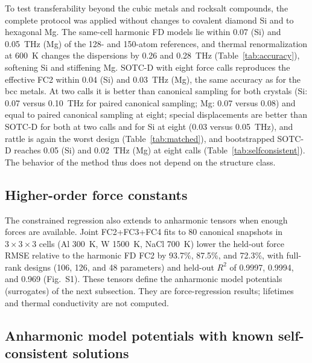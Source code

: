 \documentclass[aip,jap,reprint,amsmath,amssymb,floatfix]{revtex4-2}
\begin{document}
To test transferability beyond the cubic metals and rocksalt compounds,
the complete protocol was applied without changes to covalent diamond Si
and to hexagonal Mg. The same-cell harmonic FD models lie within 0.07 (Si)
and 0.05~THz (Mg) of the 128- and 150-atom references, and thermal
renormalization at 600~K changes the dispersions by 0.26 and 0.28~THz
(Table~\ref{tab:accuracy}), softening Si and stiffening Mg. SOTC-D with eight
force calls reproduces the effective FC2 within 0.04 (Si) and 0.03~THz (Mg),
the same accuracy as for the bcc metals. At two calls it is better than canonical
sampling for both crystals (Si: 0.07 versus 0.10~THz for
paired canonical sampling; Mg: 0.07 versus 0.08) and equal to paired
canonical sampling at eight; special displacements are better than SOTC-D
for both at two calls and for Si at eight (0.03 versus 0.05~THz), and
rattle is again the worst design (Table~\ref{tab:matched}),
and bootstrapped SOTC-D reaches 0.05 (Si) and 0.02~THz (Mg) at eight calls
(Table~\ref{tab:selfconsistent}). The behavior of the method thus does not
depend on the structure class.

\subsection{Higher-order force constants}\label{sec:ho}

The constrained regression also extends to anharmonic tensors when enough
forces are available. Joint FC2+FC3+FC4 fits to 80 canonical snapshots in
$3\times3\times3$ cells (Al 300~K, W 1500~K, NaCl 700~K) lower the held-out
force RMSE relative to the harmonic FD FC2 by 93.7\%, 87.5\%, and 72.3\%, with
full-rank designs (106, 126, and 48 parameters) and held-out $R^2$ of 0.9997,
0.9994, and 0.969 (Fig.~S1). These tensors define the anharmonic model
potentials (surrogates) of the next subsection. They are force-regression
results; lifetimes and thermal conductivity are not computed.

\subsection{Anharmonic model potentials with known self-consistent solutions}\label{sec:sc_surrogate}
\end{document}
